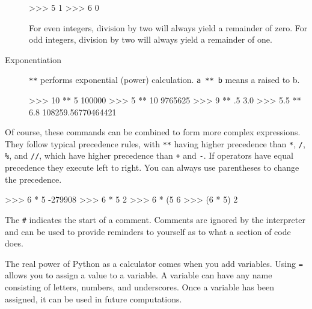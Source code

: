 \documentclass[11pt]{cselabheader}
\begin{document}
\begin{description}
    \begin{pyconcode}
>>> 5 %
1
>>> 6 %
0
    \end{pyconcode}
    For even integers, division by two will always yield a remainder of zero.
    For odd integers, division by two will always yield a remainder of one.

  \item[Exponentiation] \texttt{**} performs exponential (power) calculation.
    \texttt{a ** b} means a raised to b.

    \begin{pyconcode}
>>> 10 ** 5
100000
>>> 5 ** 10 
9765625
>>> 9 ** .5
3.0
>>> 5.5 ** 6.8
108259.56770464421
    \end{pyconcode}

%
%
\end{description}

Of course, these commands can be combined to form more complex expressions. They
follow typical precedence rules, with \texttt{**} having higher precedence than
\texttt{*}, \texttt{/}, \texttt{\%}, and \texttt{//}, which have higher
precedence than \texttt{+} and \texttt{-}. If operators have equal precedence
they execute left to right. You can always use parentheses to change the
precedence.

\begin{pyconcode}
>>> 6 * 5 %
-279908
>>> 6 * 5 %
2
>>> 6 * (5 %
6
>>> (6 * 5) %
2
\end{pyconcode}

The \texttt{\#} indicates the start of a comment. Comments are ignored by the
interpreter and can be used to provide reminders to yourself as to what a
section of code does.

The real power of Python as a calculator comes when you add variables. Using
\texttt{=} allows you to assign a value to a variable. A variable can have any
name consisting of letters, numbers, and underscores. Once a variable has been
assigned, it can be used in future computations.
\end{document}
